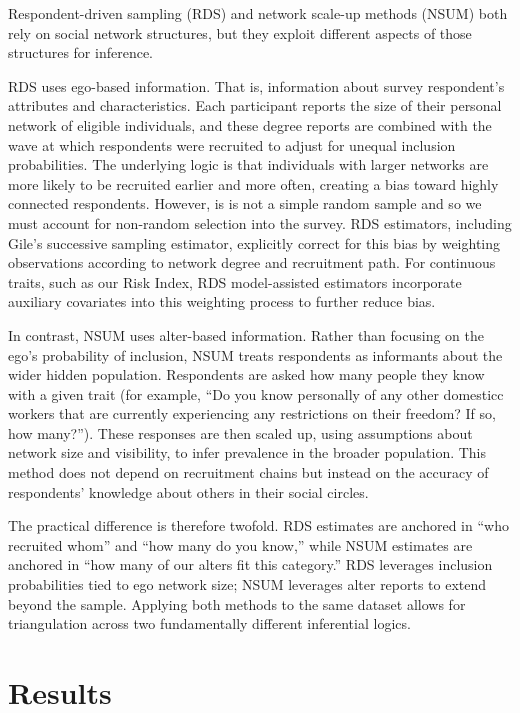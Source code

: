 \documentclass[
  12pt,
  letterpaper,
  DIV=11,
  numbers=noendperiod]{scrartcl}
\theoremstyle{plain}
\theoremstyle{definition}
\begin{document}
Respondent-driven sampling (RDS) and network scale-up methods (NSUM)
both rely on social network structures, but they exploit different
aspects of those structures for inference.

RDS uses ego-based information. That is, information about survey
respondent's attributes and characteristics. Each participant reports
the size of their personal network of eligible individuals, and these
degree reports are combined with the wave at which respondents were
recruited to adjust for unequal inclusion probabilities. The underlying
logic is that individuals with larger networks are more likely to be
recruited earlier and more often, creating a bias toward highly
connected respondents. However, is is not a simple random sample and so
we must account for non-random selection into the survey. RDS
estimators, including Gile's successive sampling estimator, explicitly
correct for this bias by weighting observations according to network
degree and recruitment path. For continuous traits, such as our Risk
Index, RDS model-assisted estimators incorporate auxiliary covariates
into this weighting process to further reduce bias.

In contrast, NSUM uses alter-based information. Rather than focusing on
the ego's probability of inclusion, NSUM treats respondents as
informants about the wider hidden population. Respondents are asked how
many people they know with a given trait (for example, ``Do you know
personally of any other domesticc workers that are currently
experiencing any restrictions on their freedom? If so, how many?'').
These responses are then scaled up, using assumptions about network size
and visibility, to infer prevalence in the broader population. This
method does not depend on recruitment chains but instead on the accuracy
of respondents' knowledge about others in their social circles.

The practical difference is therefore twofold. RDS estimates are
anchored in ``who recruited whom'' and ``how many do you know,'' while
NSUM estimates are anchored in ``how many of our alters fit this
category.'' RDS leverages inclusion probabilities tied to ego network
size; NSUM leverages alter reports to extend beyond the sample. Applying
both methods to the same dataset allows for triangulation across two
fundamentally different inferential logics.

\section{Results}\label{results}
\end{document}
